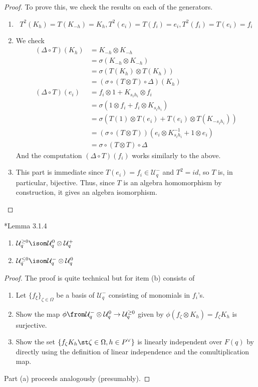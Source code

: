 \documentclass[11pt,leqno,oneside]{amsart}
\numberwithin{thm}{section}
\newcommand{\weightlattice}{P}
\newcommand{\U}{\mathcal{U}}
\begin{document}
\begin{proof}
  To prove this, we check the results on each of the generators.
  \begin{enumerate}
  \item \[
      T^2(K_h) = T(K_{-h}) = K_h, T^2(e_i) = T(f_i) = e_i, T^2(f_i) =
      T(e_i) = f_i
    \]
  \item We check
    \begin{align*}
      (\Delta \circ T)(K_h)
      & = K_{-h} \otimes K_{-h} \\
      & = \sigma(K_{-h} \otimes K_{-h}) \\
      & = \sigma(T(K_h) \otimes T(K_h)) \\
      & = (\sigma \circ (T \otimes T) \circ \Delta)(K_h) \\
      (\Delta \circ T)(e_i)
      & = f_i \otimes 1 + K_{s_i h_i} \otimes f_i \\
      & = \sigma(1 \otimes f_i + f_i \otimes K_{s_i h_i}) \\
      & = \sigma(T(1) \otimes T(e_i) + T(e_i) \otimes T(K_{-s_i h_i}))
      \\
      & = (\sigma \circ (T \otimes T)) (e_i \otimes K^{-1}_{s_i h_i} +
        1 \otimes e_i) \\
      & = \sigma \circ (T \otimes T) \circ \Delta       
    \end{align*}
    And the computation \((\Delta \circ T)(f_i)\) works similarly to
    the above.
  \item This part is immediate since \(T(e_i) = f_i \in \U_q^-\) and
    \(T^2 = id\), so \(T\) is, in particular, bijective. Thus, since
    \(T\) is an algebra homomorphism by construction, it gives an
    algebra isomorphism.
  \end{enumerate}
\end{proof}
\begin{lem}
  \cite{hong-kang}*{Lemma 3.1.4}
  \begin{enumerate}
  \item \(\U_q^{\geq 0} \isom \U_q^0 \otimes \U_q^+\)
  \item \(\U_q^{\leq 0} \isom \U_q^- \otimes \U_q^0\)
  \end{enumerate}
\end{lem}
\begin{proof}
  The proof is quite technical but for item (b) consists of
  \begin{enumerate}[label=(\roman*)]
  \item Let \(\{f_\xi\}_{\zeta \in \Omega}\) be a basis of \(\U_q^-\)
    consisting of monomials in \(f_i\)'s.
  \item Show the map \(\phi \from \U_q^- \otimes \U_q^0 \to \U_q^{\geq
    0}\) given by \(\phi(f_\zeta \otimes K_h) = f_\zeta K_h\) is
  surjective.
  \item Show the set \(\{f_\zeta K_h \st \zeta \in \Omega, h \in
    \weightlattice^\vee\}\) is linearly independent over \(F(q)\) by
    directly using the definition of linear independence and the
    comultiplication map.
  \end{enumerate}
  Part (a) proceeds analogously (presumably). 
\end{proof}
\end{document}
